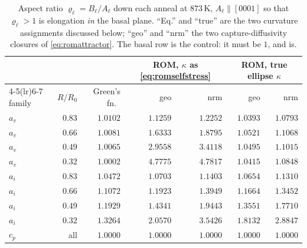 \documentclass{article}
\begin{document}
\begin{table}[htbp]
\centering
\caption{Aspect ratio $\varrho_\ell=B_\ell/A_\ell$ down each anneal at $873\,$K,
$A_\ell\parallel[0001]$ so that $\varrho_\ell>1$ is elongation \emph{in} the basal
plane. ``Eq.'' and ``true'' are the two curvature assignments discussed below;
``geo'' and ``nrm'' the two capture-diffusivity closures of
\cref{eq:romattractor}. The basal row is the control: it must be $1$, and is.}
\label{tab:anneal-shape}
\begin{tabular}{@{}l r r rr rr@{}}
\toprule
 & & & \multicolumn{2}{c}{ROM, $\kappa$ as \cref{eq:romselfstress}}
 & \multicolumn{2}{c}{ROM, true ellipse $\kappa$}\\
\cmidrule(lr){4-5}\cmidrule(lr){6-7}
family & $R/R_0$ & Green's fn.\ & geo & nrm & geo & nrm\\
\midrule
$a_v$ & $0.83$ & $1.0102$ & $1.1259$ & $1.2252$ & $1.0393$ & $1.0793$\\
$a_v$ & $0.66$ & $1.0081$ & $1.6333$ & $1.8795$ & $1.0521$ & $1.1068$\\
$a_v$ & $0.49$ & $1.0065$ & $2.9558$ & $3.4118$ & $1.0495$ & $1.1015$\\
$a_v$ & $0.32$ & $\mathbf{1.0002}$ & $\mathbf{4.7775}$ & $4.7817$ & $\mathbf{1.0415}$ & $1.0848$\\
\addlinespace
$a_i$ & $0.83$ & $1.0472$ & $1.0703$ & $1.1403$ & $1.0654$ & $1.1310$\\
$a_i$ & $0.66$ & $1.1072$ & $1.1923$ & $1.3949$ & $1.1664$ & $1.3452$\\
$a_i$ & $0.49$ & $1.1929$ & $1.4341$ & $1.9443$ & $1.3551$ & $1.7710$\\
$a_i$ & $0.32$ & $\mathbf{1.3264}$ & $\mathbf{2.0570}$ & $3.5426$ & $\mathbf{1.8132}$ & $2.8847$\\
\addlinespace
$c_p$ & all    & $1.0000$ & $1.0000$ & $1.0000$ & $1.0000$ & $1.0000$\\
\bottomrule
\end{tabular}
\end{table}
\end{document}
